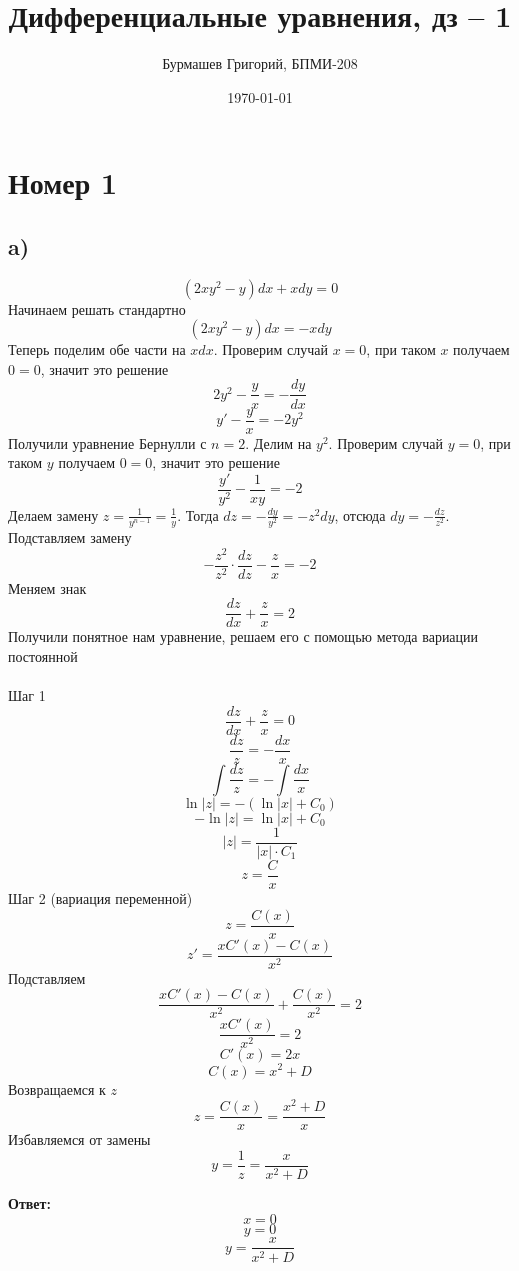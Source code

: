\documentclass[a4paper,12pt]{article}
\author{Бурмашев Григорий, БПМИ-208}
\title{Дифференциальные уравнения, дз -- 1}
\date{\today}
\begin{document}
\maketitle
\clearpage
\section*{Номер 1}
\subsection*{a)}
\[
(2xy^2 -y) d x + x dy = 0
\]
Начинаем решать стандартно
\[
(2xy^2 -y) d x = - xdy
\]
Теперь поделим обе части на $xdx$. Проверим случай $x = 0$, при таком $x$ получаем $0 = 0$, значит это решение
\[
2y^2 - \frac{y}{x} = - \frac{dy}{dx}
\]
\[
y' - \frac{y}{x} = -2y^2
\]
Получили уравнение Бернулли с $n = 2$. Делим на $y^2$. Проверим случай $y = 0$, при таком $y$ получаем $0 = 0$, значит это решение
\[
\frac{y'}{y^2} - \frac{1}{xy} = -2
\]
Делаем замену $z = \frac{1}{y^{n -1}} = \frac{1}{y}$. Тогда $dz = -\frac{dy}{y^2} = -z^2dy$, отсюда $dy =  -\frac{dz}{z^2}$. Подставляем замену
\[
-\frac{z^2}{z^2} \cdot \frac{dz}{dz} - \frac{z}{x}  = -2
\]
Меняем знак 
\[
\frac{dz}{dx} + \frac{z}{x} = 2
\]
Получили понятное нам уравнение, решаем его с помощью метода вариации постоянной
\\\\
Шаг 1
\[
\frac{dz}{dx} + \frac{z}{x} = 0
\]
\[
\frac{dz}{z} = -\frac{dx}{x}
\]
\[
\int \frac{dz}{z}  = - \int \frac{dx}{x}
\]
\[
\ln |z| = - \left(\ln |x| + C_0\right)
\]
\[
- \ln |z| =  \ln |x| + C_0
\]
\[
|z| = \frac{1}{|x| \cdot C_1}
\]
\[
z = \frac{C}{x}
\]
Шаг 2 (вариация переменной)
\[
z = \frac{C(x)}{x}
\]
\[
z' = \frac{xC'(x) - C(x)}{x^2}
\]
Подставляем
\[
\frac{xC'(x) - C(x)}{x^2} + \frac{C(x)}{x^2} = 2
\]
\[
\frac{xC'(x)}{x^2} = 2
\]
\[
C'(x) = 2x
\]
\[
C(x) = x^2 + D
\]
Возвращаемся к $z$
\[
z = \frac{C(x)}{x} = \frac{x^2 + D}{x}
\]
Избавляемся от замены
\[
y = \frac{1}{z} = \frac{x}{x^2 + D}
\]
\begin{center}
\textbf{Ответ: } 
\[
x = 0
\]
\[
y = 0
\]
\[
y = \frac{x}{x^2 + D}
\]
\end{center}
\clearpage
\end{document}

